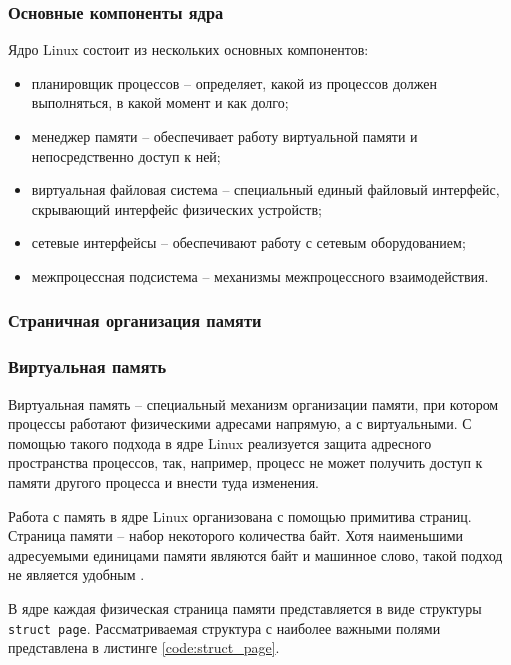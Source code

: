 \subsubsection{Основные компоненты ядра}

Ядро Linux состоит из нескольких основных компонентов:

\begin{itemize}
	\item планировщик процессов -- определяет, какой из процессов должен выполняться, в какой момент и как долго;
	\item менеджер памяти -- обеспечивает работу виртуальной памяти и непосредственно доступ к ней;
	\item виртуальная файловая система -- специальный единый файловый интерфейс, скрывающий интерфейс физических устройств;
	\item сетевые интерфейсы -- обеспечивают работу с сетевым оборудованием;
	\item межпроцессная подсистема -- механизмы межпроцессного взаимодействия.
\end{itemize}

\subsubsection{Страничная организация памяти}

\subsubsection{Виртуальная память}

Виртуальная память -- специальный механизм организации памяти, при котором процессы работают физическими адресами напрямую, а с виртуальными. С помощью такого подхода в ядре Linux реализуется защита адресного пространства процессов, так, например, процесс не может получить доступ к памяти другого процесса и внести туда изменения.

Работа с память в ядре Linux организована с помощью примитива страниц. Страница памяти -- набор некоторого количества байт. Хотя наименьшими адресуемыми единицами памяти являются байт и машинное слово, такой подход не является удобным \cite{kernel-development}. 

В ядре каждая физическая страница памяти представляется в виде структуры \texttt{struct page}. Рассматриваемая структура с наиболее важными полями представлена в листинге \ref{code:struct_page}.


